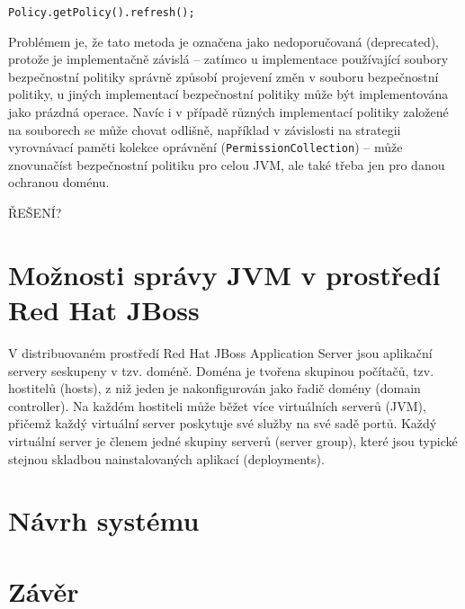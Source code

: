 \begin{verbatim}
Policy.getPolicy().refresh();
\end{verbatim}

Problémem je, že tato metoda je označena jako nedoporučovaná (deprecated), protože je implementačně závislá -- zatímco u implementace používající soubory bezpečnostní politiky správně způsobí projevení změn v souboru bezpečnostní politiky, u jiných implementací bezpečnostní politiky může být implementována jako prázdná operace. Navíc i v případě různých implementací politiky založené na souborech se může chovat odlišně, například v závislosti na strategii vyrovnávací paměti kolekce oprávnění ({\tt PermissionCollection}) -- může znovunačíst bezpečnostní politiku pro celou JVM, ale také třeba jen pro danou ochranou doménu. \cite{refPolicy}


ŘEŠENÍ?


\chapter{Možnosti správy JVM v prostředí Red Hat JBoss}

V distribuovaném prostředí Red Hat JBoss Application Server jsou aplikační servery seskupeny v tzv. doméně.
Doména je tvořena skupinou počítačů, tzv. hostitelů (hosts), z niž jeden je nakonfigurován jako řadič domény (domain controller).
Na každém hostiteli může běžet více virtuálních serverů (JVM), přičemž každý virtuální server poskytuje své služby na své sadě portů.
Každý virtuální server je členem jedné skupiny serverů (server group), které jsou typické stejnou skladbou nainstalovaných aplikací (deployments).





\chapter{Návrh systému}







\chapter{Závěr}





